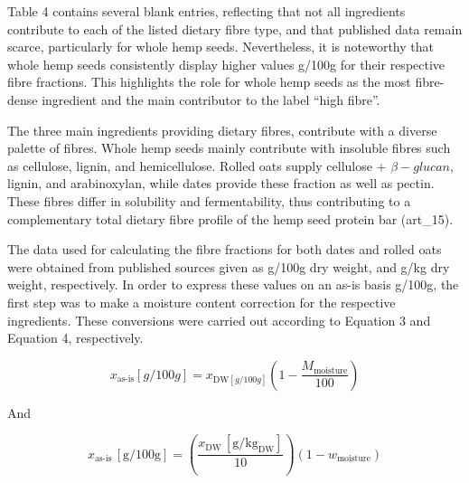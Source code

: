 \vspace{1em}
Table 4 contains several blank entries, reflecting that not all ingredients contribute to each of the listed dietary fibre type, and that published data remain scarce, particularly for whole hemp seeds. Nevertheless, it is noteworthy that whole hemp seeds consistently display higher values g/100g for their respective fibre fractions. This highlights the role for whole hemp seeds as the most fibre-dense ingredient and the main contributor to the label “high fibre”. 

\vspace{1em}
The three main ingredients providing dietary fibres, contribute with a diverse palette of fibres. Whole hemp seeds mainly contribute with insoluble fibres such as cellulose, lignin, and hemicellulose. Rolled oats supply cellulose + $\beta-glucan$, lignin, and arabinoxylan, while dates provide these fraction as well as pectin. These fibres differ in solubility and fermentability, thus contributing to a complementary total dietary fibre profile of the hemp seed protein bar (art\_15).

\vspace{1em}
The data used for calculating the fibre fractions for both dates and rolled oats were obtained from published sources given as g/100g dry weight, and g/kg dry weight, respectively. In order to express these values on an as-is basis g/100g, the first step was to make a moisture content correction for the respective ingredients. These conversions were carried out according to Equation 3 and Equation 4, respectively. 

\begin{equation}
    x_{\text{as-is}} [g/100g]=
    x_{\text{DW} [g/100g]}\left(1 - \frac{M_{\text{moisture}}}{100}\right)
\end{equation}

And

\begin{equation}
    x_{\text{as-is}}\,[\mathrm{g}/100\mathrm{g}] =
    \left(\frac{x_{\text{DW}}\,[\mathrm{g}/\mathrm{kg}_{\text{DW}}]}{10}\right)
    \left(1 - w_{\text{moisture}}\right)
    \label{eq:asis_from_gkgdw}
\end{equation}
    
    
